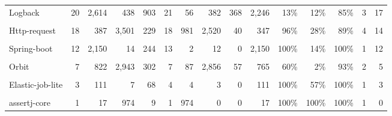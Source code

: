 \begin{table*}[t]
\begin{tabular}{l|rrr|rr|rrrrrrr|rr}
Logback&20&2,614&438&903&21&56&382&368&2,246&13\%&12\%&85\%&3&17\\
\cellcolor{gray!6}{Wildfly}&\cellcolor{gray!6}{18}&\cellcolor{gray!6}{4,364}&\cellcolor{gray!6}{50}&\cellcolor{gray!6}{1,497}&\cellcolor{gray!6}{18}&\cellcolor{gray!6}{38}&\cellcolor{gray!6}{12}&\cellcolor{gray!6}{0}&\cellcolor{gray!6}{4,364}&\cellcolor{gray!6}{100\%}&\cellcolor{gray!6}{76\%}&\cellcolor{gray!6}{100\%}&\cellcolor{gray!6}{6}&\cellcolor{gray!6}{12}\\
Http-request&18&387&3,501&229&18&981&2,520&40&347&96\%&28\%&89\%&4&14\\
\cellcolor{gray!6}{Wro4j}&\cellcolor{gray!6}{14}&\cellcolor{gray!6}{540}&\cellcolor{gray!6}{10,833}&\cellcolor{gray!6}{90}&\cellcolor{gray!6}{21}&\cellcolor{gray!6}{800}&\cellcolor{gray!6}{10,033}&\cellcolor{gray!6}{29}&\cellcolor{gray!6}{511}&\cellcolor{gray!6}{96\%}&\cellcolor{gray!6}{7\%}&\cellcolor{gray!6}{94\%}&\cellcolor{gray!6}{9}&\cellcolor{gray!6}{11}\\
Spring-boot&12&2,150&14&244&13&2&12&0&2,150&100\%&14\%&100\%&1&12\\
\cellcolor{gray!6}{Undertow}&\cellcolor{gray!6}{7}&\cellcolor{gray!6}{2,304}&\cellcolor{gray!6}{92}&\cellcolor{gray!6}{236}&\cellcolor{gray!6}{12}&\cellcolor{gray!6}{8}&\cellcolor{gray!6}{84}&\cellcolor{gray!6}{940}&\cellcolor{gray!6}{1,364}&\cellcolor{gray!6}{0\%}&\cellcolor{gray!6}{8\%}&\cellcolor{gray!6}{59\%}&\cellcolor{gray!6}{2}&\cellcolor{gray!6}{6}\\
Orbit&7&822&2,943&302&7&87&2,856&57&765&60\%&2\%&93\%&2&5\\
\cellcolor{gray!6}{Achilles}&\cellcolor{gray!6}{4}&\cellcolor{gray!6}{442}&\cellcolor{gray!6}{165}&\cellcolor{gray!6}{245}&\cellcolor{gray!6}{5}&\cellcolor{gray!6}{120}&\cellcolor{gray!6}{45}&\cellcolor{gray!6}{46}&\cellcolor{gray!6}{396}&\cellcolor{gray!6}{72\%}&\cellcolor{gray!6}{72\%}&\cellcolor{gray!6}{89\%}&\cellcolor{gray!6}{1}&\cellcolor{gray!6}{3}\\
Elastic-job-lite&3&111&7&68&4&4&3&0&111&100\%&57\%&100\%&1&3\\
\cellcolor{gray!6}{Cmmons-exec}&\cellcolor{gray!6}{1}&\cellcolor{gray!6}{59}&\cellcolor{gray!6}{33}&\cellcolor{gray!6}{13}&\cellcolor{gray!6}{1}&\cellcolor{gray!6}{0}&\cellcolor{gray!6}{33}&\cellcolor{gray!6}{2}&\cellcolor{gray!6}{57}&\cellcolor{gray!6}{0\%}&\cellcolor{gray!6}{0\%}&\cellcolor{gray!6}{96\%}&\cellcolor{gray!6}{0}&\cellcolor{gray!6}{1}\\
assertj-core&1&17&974&9&1&974&0&0&17&100\%&100\%&100\%&1&0\\

\end{tabular}
\end{table*}
